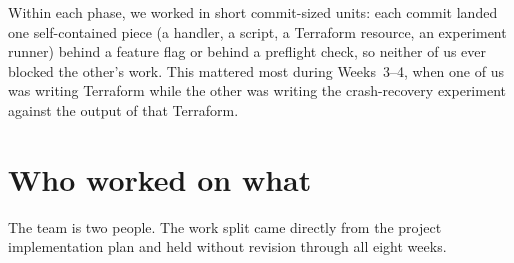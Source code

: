 \documentclass[11pt,a4paper]{article}
\begin{document}
Within each phase, we worked in short commit-sized units: each commit landed one self-contained piece (a handler, a script, a Terraform resource, an experiment runner) behind a feature flag or behind a preflight check, so neither of us ever blocked the other's work. This mattered most during Weeks~3--4, when one of us was writing Terraform while the other was writing the crash-recovery experiment against the output of that Terraform.

\section{Who worked on what}

The team is two people. The work split came directly from the project implementation plan and held without revision through all eight weeks.
\end{document}
